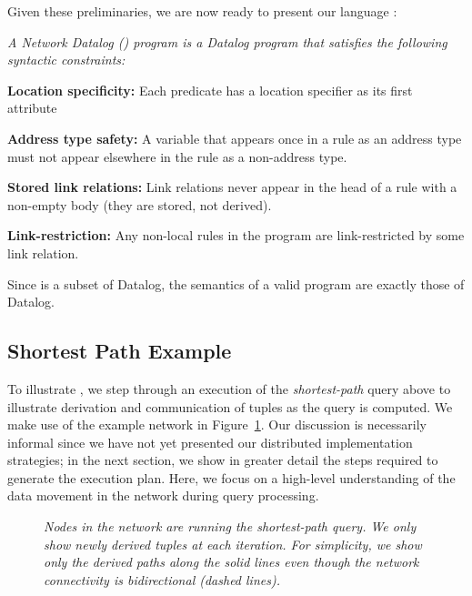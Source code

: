 Given these preliminaries, we are now ready to present our language \Dlog:

\begin{Def}{\em A Network Datalog (\Dlog) program is a Datalog program that satisfies
    the following syntactic constraints:
\begin{myenumerate}
\item {\bf Location specificity:} Each predicate has a location
  specifier as its first attribute 
\item {\bf Address type safety:} A variable that appears once in a
  rule as an address type must not appear elsewhere in the rule
  as a non-address type.
\item {\bf Stored link relations:} Link relations never appear in the head of a rule with a
  non-empty body (\ie they are stored, not derived).
\item {\bf Link-restriction:} Any non-local rules in the program are
  link-restricted by some link relation.
\end{myenumerate}
}
\end{Def}
Since \Dlog is a subset of Datalog, the semantics of a valid \Dlog
program are exactly those of Datalog.

\subsection{Shortest Path Example}
\label{sec:queryExec}
To illustrate \Dlog, we step through an execution of the {\em
shortest-path} query above to illustrate derivation and communication
of tuples as the query is computed. We make use of the example network
in Figure~\ref{SP example}.  Our discussion is necessarily informal
since we have not yet presented our distributed implementation
strategies; in the next section, we show in greater detail the steps
required to generate the execution plan.  Here, we focus on a
high-level understanding of the data movement in the network during
query processing.


\begin{figure}[ht]
\centering
{}
\caption{\label{SP example}\emph{\small Nodes in the
    network are running the shortest-path query. We only show newly
    derived tuples at each iteration. For
    simplicity, we show only the derived paths along the
    solid lines even though the network connectivity is bidirectional (dashed lines).}}
\end{figure}                                              

